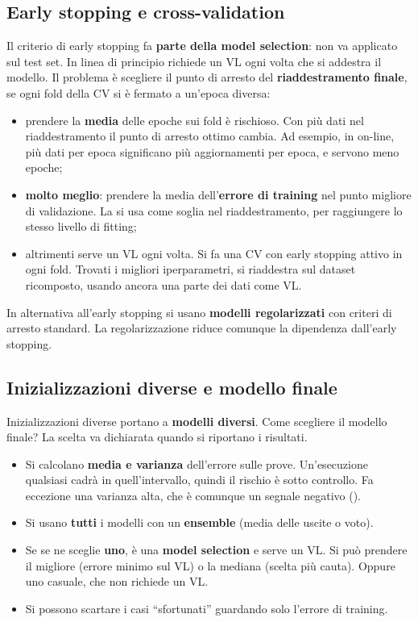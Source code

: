\subsection{Early stopping e cross-validation}
Il criterio di early stopping fa \textbf{parte della model selection}: non va applicato sul test set. In linea di
principio richiede un VL ogni volta che si addestra il modello. Il problema è scegliere il punto di arresto del
\textbf{riaddestramento finale}, se ogni fold della CV si è fermato a un'epoca diversa:
\begin{itemize}
  \item prendere la \textbf{media} delle epoche sui fold è rischioso. Con più dati nel riaddestramento il punto di
        arresto ottimo cambia. Ad esempio, in on-line, più dati per epoca significano più aggiornamenti per epoca,
        e servono meno epoche;
  \item \textbf{molto meglio}: prendere la media dell'\textbf{errore di training} nel punto migliore di validazione.
        La si usa come soglia nel riaddestramento, per raggiungere lo stesso livello di fitting;
  \item altrimenti serve un VL ogni volta. Si fa una CV con early stopping attivo in ogni fold. Trovati i migliori
        iperparametri, si riaddestra sul dataset ricomposto, usando ancora una parte dei dati come VL.
\end{itemize}
In alternativa all'early stopping si usano \textbf{modelli regolarizzati} con criteri di arresto standard. La
regolarizzazione riduce comunque la dipendenza dall'early stopping.

\subsection{Inizializzazioni diverse e modello finale}
Inizializzazioni diverse portano a \textbf{modelli diversi}. Come scegliere il modello finale? La scelta va
dichiarata quando si riportano i risultati.
\begin{itemize}
  \item Si calcolano \textbf{media e varianza} dell'errore sulle prove. Un'esecuzione qualsiasi cadrà in
        quell'intervallo, quindi il rischio è sotto controllo. Fa eccezione una varianza alta, che è comunque un
        segnale negativo ().
  \item Si usano \textbf{tutti} i modelli con un \textbf{ensemble} (media delle uscite o voto).
  \item Se se ne sceglie \textbf{uno}, è una \textbf{model selection} e serve un VL. Si può prendere il migliore
        (errore minimo sul VL) o la mediana (scelta più cauta). Oppure uno casuale, che non richiede un VL.
  \item Si possono scartare i casi ``sfortunati'' guardando solo l'errore di training.
\end{itemize}

